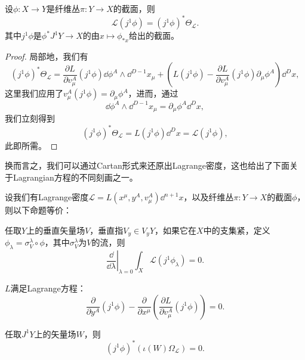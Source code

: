 \begin{pro}\label{pro:1.17}
    设$\phi:X\to Y$是纤维丛$\pi:Y\to X$的截面，则
    \[
        \mathcal L(j^1\phi)=(j^1\phi)^*\Theta_{\mathcal L}.
    \]
    其中$j^1\phi$是$\phi^*J^1Y\to X$的由$x\mapsto \phi_{*x}$给出的截面。
\end{pro}

\begin{proof}
    局部地，我们有
    \[
        (j^1\phi)^*\Theta_{\mathcal L}=\frac{\partial L}{\partial v^A_\mu}(j^1\phi)\dd \phi^A\wedge \dd^{D-1}x_\mu + \left(L(j^1\phi)-\frac{\partial L}{\partial v^A_\mu}(j^1\phi)\partial_\mu \phi^A\right)\dd^{D} x,
    \]
    这里我们应用了$v_\mu^A(j^1\phi)=\partial_\mu\phi^A$，进而，通过
    \[
        \dd \phi^A\wedge \dd^{D-1}x_\mu=\partial_\mu \phi^A\dd^{D} x,
    \]
    我们立刻得到
    \[
        (j^1\phi)^*\Theta_{\mathcal L}=L(j^1\phi)\dd^{D} x=\mathcal L(j^1\phi),
    \]
    此即所需。
\end{proof}

换而言之，我们可以通过Cartan形式来还原出Lagrange密度，这也给出了下面关于Lagrangian方程的不同刻画之一。

\begin{thm}
    设我们有Lagrange密度$\mathcal{L}=L\left(x^\mu,y^A,v^A_\mu\right)\dd^{n+1}x$，以及纤维丛$\pi:Y\to X$的截面$\phi$，则以下命题等价：
    \begin{compactenum}
        \item 任取$Y$上的垂直矢量场$V$，垂直指$V_y\in V_yY$，如果它在$X$中的支集紧，定义$\phi_\lambda=\sigma^\lambda_V\circ \phi$，其中$\sigma^\lambda_V$为$V$的流，则\[\left.\frac{\dd}{\dd \lambda}\right|_{\lambda=0}\int_X \mathcal L(j^1\phi_\lambda)=0.\]
        \item $L$满足Lagrange方程：
        \[
            \frac{\partial}{\partial y^A}(j^1\phi)-\frac{\partial}{\partial x^\mu}\left(\frac{\partial L}{\partial v^A_\mu}(j^1\phi)\right)=0.
        \]
        \item 任取$J^1Y$上的矢量场$W$，则 
        \[
            (j^1\phi)^*(\iota(W)\Omega_{\mathcal L})=0.
        \]
    \end{compactenum}
\end{thm}

